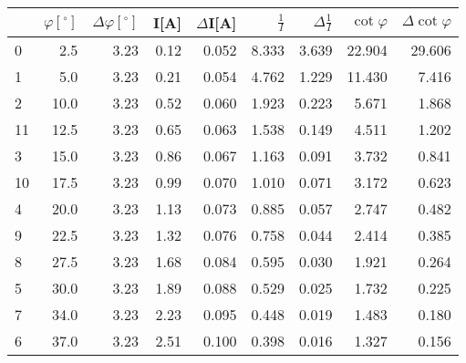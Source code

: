\begin{tabular}{lrrrrrrrr}
\toprule
{} &  $\varphi[^\circ]$ &  $\Delta \varphi[^\circ]$ &  I[A] &  $\Delta$I[A] &  $\frac{1}{I}$ &  $\Delta \frac{1}{I}$ &  $\cot{\varphi}$ &  $\Delta \cot{\varphi}$ \\
\midrule
0  &                2.5 &                     3.23 &  0.12 &         0.052 &          8.333 &                 3.639 &           22.904 &                  29.606 \\
1  &                5.0 &                     3.23 &  0.21 &         0.054 &          4.762 &                 1.229 &           11.430 &                   7.416 \\
2  &               10.0 &                     3.23 &  0.52 &         0.060 &          1.923 &                 0.223 &            5.671 &                   1.868 \\
11 &               12.5 &                     3.23 &  0.65 &         0.063 &          1.538 &                 0.149 &            4.511 &                   1.202 \\
3  &               15.0 &                     3.23 &  0.86 &         0.067 &          1.163 &                 0.091 &            3.732 &                   0.841 \\
10 &               17.5 &                     3.23 &  0.99 &         0.070 &          1.010 &                 0.071 &            3.172 &                   0.623 \\
4  &               20.0 &                     3.23 &  1.13 &         0.073 &          0.885 &                 0.057 &            2.747 &                   0.482 \\
9  &               22.5 &                     3.23 &  1.32 &         0.076 &          0.758 &                 0.044 &            2.414 &                   0.385 \\
8  &               27.5 &                     3.23 &  1.68 &         0.084 &          0.595 &                 0.030 &            1.921 &                   0.264 \\
5  &               30.0 &                     3.23 &  1.89 &         0.088 &          0.529 &                 0.025 &            1.732 &                   0.225 \\
7  &               34.0 &                     3.23 &  2.23 &         0.095 &          0.448 &                 0.019 &            1.483 &                   0.180 \\
6  &               37.0 &                     3.23 &  2.51 &         0.100 &          0.398 &                 0.016 &            1.327 &                   0.156 \\
\bottomrule
\end{tabular}
